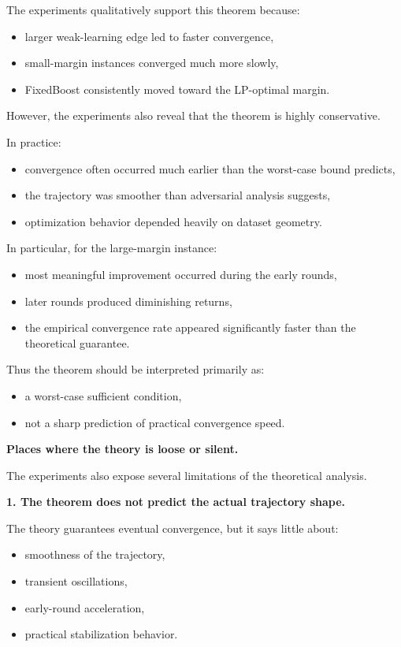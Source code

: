 \documentclass[11pt]{article}
\begin{document}
\begin{enumerate}
\begin{solutionbox}
The experiments qualitatively support this theorem because:
\begin{itemize}
    \item larger weak-learning edge led to faster convergence,
    \item small-margin instances converged much more slowly,
    \item FixedBoost consistently moved toward the LP-optimal margin.
\end{itemize}

However, the experiments also reveal that the theorem is highly conservative.

In practice:
\begin{itemize}
    \item convergence often occurred much earlier than the worst-case bound predicts,
    \item the trajectory was smoother than adversarial analysis suggests,
    \item optimization behavior depended heavily on dataset geometry.
\end{itemize}

In particular, for the large-margin instance:
\begin{itemize}
    \item most meaningful improvement occurred during the early rounds,
    \item later rounds produced diminishing returns,
    \item the empirical convergence rate appeared significantly faster than the theoretical guarantee.
\end{itemize}

Thus the theorem should be interpreted primarily as:
\begin{itemize}
    \item a worst-case sufficient condition,
    \item not a sharp prediction of practical convergence speed.
\end{itemize}

\medskip

\textbf{Places where the theory is loose or silent.}

The experiments also expose several limitations of the theoretical analysis.

\bigskip

\textbf{1. The theorem does not predict the actual trajectory shape.}

The theory guarantees eventual convergence, but it says little about:
\begin{itemize}
    \item smoothness of the trajectory,
    \item transient oscillations,
    \item early-round acceleration,
    \item practical stabilization behavior.
\end{itemize}


\end{solutionbox}
\end{enumerate}
\end{document}

